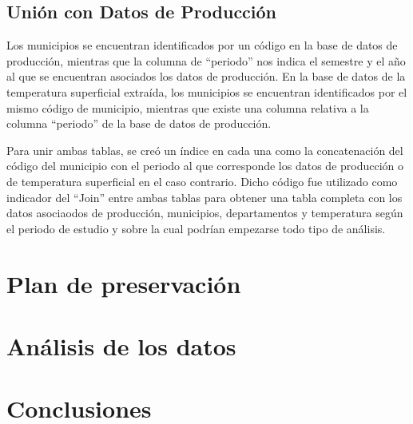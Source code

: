\documentclass[12pt, spanish]{article}
\begin{document}
\subsection{Unión con Datos de Producción}

Los municipios se encuentran identificados por un código en la base de datos de producción, mientras que la columna de ``periodo'' nos indica el semestre y el año al que se encuentran asociados los datos de producción. En la base de datos de la temperatura superficial extraída, los municipios se encuentran identificados por el mismo código de municipio, mientras que existe una columna relativa a la columna ``periodo''  de la base de datos de producción.

Para unir ambas tablas, se creó un índice en cada una como la concatenación del código del municipio con el periodo al que corresponde los datos de producción o de temperatura superficial en el caso contrario. Dicho código fue utilizado como indicador del ``Join''  entre ambas tablas para obtener una tabla completa con los datos asociaodos de producción, municipios, departamentos y temperatura según el periodo de estudio y sobre la cual podrían empezarse todo tipo de análisis.



\section{Plan de preservación}

\section{Análisis de los datos}



\section{Conclusiones}

\newpage
\end{document}
